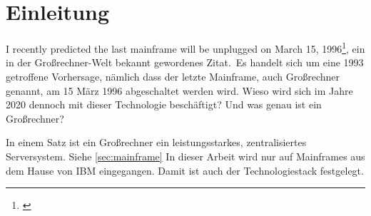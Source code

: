 \chapter{Einleitung}\label{ch:einleitung}
\glqq I recently predicted the last mainframe will be unplugged on March 15, 1996\grqq \footnote{\cite{Alsop.1993}}, ein in der Großrechner-Welt bekannt gewordenes Zitat.\
Es handelt sich um eine 1993 getroffene Vorhersage, nämlich dass der letzte Mainframe, auch Großrechner genannt, am 15 März 1996 abgeschaltet werden wird.
Wieso wird sich im Jahre 2020 dennoch mit dieser Technologie beschäftigt? 
Und was genau ist ein Großrechner?

In einem Satz ist ein Großrechner ein leistungsstarkes, zentralisiertes Serversystem. 
Siehe \ref{sec:mainframe}
In dieser Arbeit wird nur auf Mainframes aus dem Hause von IBM eingegangen.
Damit ist auch der Technologiestack festgelegt.
